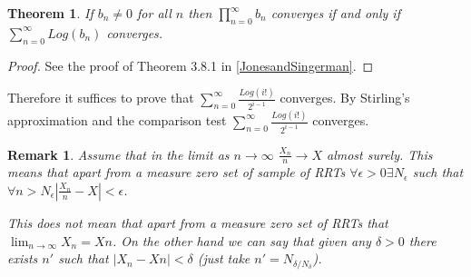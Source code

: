\documentclass[10pt]{article} %
\newtheorem{remk}{Remark}
\newtheorem{thm}{Theorem}[section]
\theoremstyle{definition}
\begin{document}
\begin{thm}
 If $b_n \neq 0$  for all $n$ then $\prod_{n=0}^{\infty}b_{n}$ converges if and only if $\sum_{n=0}^{\infty}Log(b_{n})$ converges. 
\end{thm}
\begin{proof}
 See the proof of Theorem 3.8.1 in \ref{JonesandSingerman}.
\end{proof}

Therefore it suffices to prove that $\sum_{n=0}^{\infty}\frac{Log(i!)}{2^{i -1}}$ converges.  By Stirling's approximation and the comparison test $\sum_{n=0}^{\infty}\frac{Log(i!)}{2^{i -1}}$ converges. 



\begin{remk}
 Assume that in the limit as $ n \rightarrow \infty$ $\frac{X_n}{n} \rightarrow X$ almost surely.  This means that apart from a measure zero set of sample of RRTs $\forall \epsilon>0 \exists N_{\epsilon}$ such that $\forall n >N_{\epsilon} |\frac{X_n}{n} - X| < \epsilon$.
 
 This does \emph{not} mean that apart from a measure zero set of RRTs that $\lim_{n \rightarrow \infty} X_n = Xn$. On the other hand we can say that given any $\delta >0$ there exists $n'$ such that $|X_n - Xn| < \delta$  (just take $n' = N_{\delta/N_\delta}$).
 
 
\end{remk}
\end{document}
